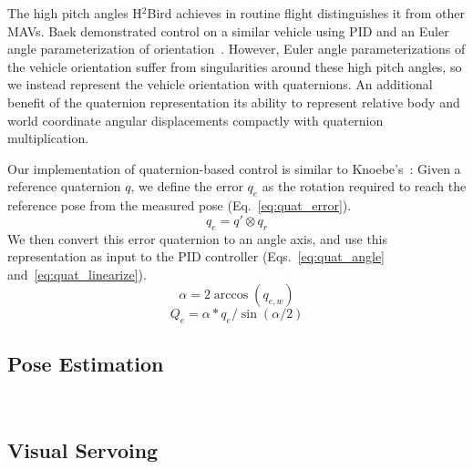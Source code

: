 \documentclass{aamas2013}
\begin{document}
The high pitch angles H$^2$Bird achieves in routine flight distinguishes it 
from other MAVs. Baek 
demonstrated control on a similar vehicle using PID and an Euler angle
parameterization of orientation~\cite{baek:tracking}. However, Euler angle parameterizations of the vehicle orientation 
suffer from singularities around these high pitch angles, so we instead 
represent the vehicle orientation with quaternions. An additional benefit of 
the quaternion representation its ability to represent relative body and 
world coordinate angular displacements compactly with quaternion 
multiplication.

Our implementation of quaternion-based control is similar to Knoebe's~\cite{knoebe:quatcontrol}:
Given a reference quaternion $q$, we define the error $q_e$ as the rotation 
required to reach the reference pose from the measured pose (Eq.~\ref{eq:quat_error}). 
\begin{equation}
\label{eq:quat_error}
q_e = q'\otimes q_r
\end{equation}
We then convert this error quaternion to an angle axis, and use this 
representation as input to the PID controller 
(Eqs.~\ref{eq:quat_angle} and~\ref{eq:quat_linearize}). 
\begin{equation}
\label{eq:quat_angle}
\alpha = 2\arccos(q_{e,w})
\end{equation}
\begin{equation}
\label{eq:quat_linearize}
Q_e = \alpha*q_e/\sin(\alpha /2)
\end{equation}

\subsection{Pose Estimation}
~\cite{thrun2005probabilistic}

\subsection{Visual Servoing}
\end{document}
